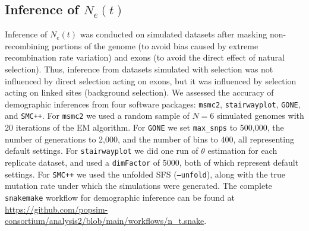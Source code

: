 \documentclass[hidelinks]{article}
\newcommand{\snakemake}{\texttt{snakemake}\xspace}
\newcommand{\msmc}{\texttt{msmc2}\xspace}
\newcommand{\stairway}{\texttt{stairwayplot}\xspace}
\newcommand{\gone}{\texttt{GONE}\xspace}
\newcommand{\smcpp}{\texttt{SMC++}\xspace}
\begin{document}
    \subsection*{Inference of $N_e(t)$}
    Inference of $N_e(t)$ was conducted on simulated datasets after masking non-recombining portions
    of the genome (to avoid bias caused by extreme recombination rate variation)
    and exons (to avoid the direct effect of natural selection).
    Thus, inference from datasets simulated with selection was not influenced by direct selection
    acting on exons, but it was influenced by selection acting on linked sites (background selection).
    We assessed the accuracy of demographic inferences from four software packages:
    \msmc \citep{Schiffels2020}, \stairway \citep{liu2020stairway}, \gone \citep{santiago2020recent},
    and \smcpp \citep{terhorst2017robust}.
    For \msmc
    we used a random sample of $N=6$ simulated genomes with 20
    iterations of the EM algorithm.
    For \gone we set \texttt{max\_snps} to 500,000,
    the number of generations to 2,000, and the number of bins to 400, all representing default settings.
    For \stairway we did one run of $\theta$ estimation for each replicate dataset,
    and used a \texttt{dimFactor} of 5000, both of which represent default settings.
    For \smcpp we used the unfolded SFS (\texttt{--unfold}),
    along with the true mutation rate under which the simulations were generated.
    The complete \snakemake workflow for demographic inference can be found at
    \url{https://github.com/popsim-consortium/analysis2/blob/main/workflows/n_t.snake}.
\end{document}
